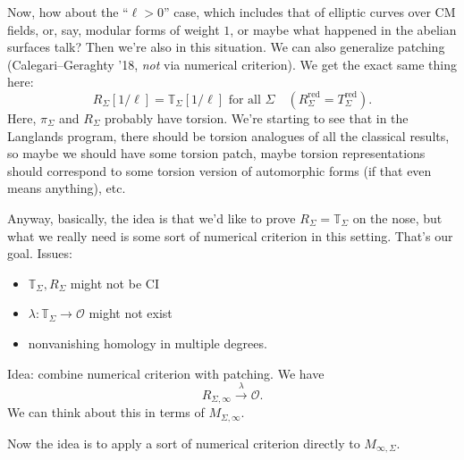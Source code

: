 \documentclass[reqno]{amsart} 
\begin{document}
Now, how about the ``$\ell > 0$'' case, which includes that of elliptic curves over CM fields, or, say, modular forms of weight $1$, or maybe what happened in the abelian surfaces talk?  Then we're also in this situation.  We can also generalize patching (Calegari--Geraghty '18, \emph{not} via numerical criterion).  We get the exact same thing here:
\begin{equation*}
  R_{\Sigma}[1 / \ell]
  = \mathbb{T}_{\Sigma}[1 / \ell] \text{ for all }
  \Sigma
  \quad
  (R_{\Sigma}^{\mathrm{red}} = T_{\Sigma}^{\mathrm{red}}).
\end{equation*}
Here, $\pi_{\Sigma}$ and $R_{\Sigma}$ probably have torsion.  We're starting to see that in the Langlands program, there should be torsion analogues of all the classical results, so maybe we should have some torsion patch, maybe torsion representations should correspond to some torsion version of automorphic forms (if that even means anything), etc.

Anyway, basically, the idea is that we'd like to prove $R_{\Sigma} = \mathbb{T}_{\Sigma}$ on the nose, but what we really need is some sort of numerical criterion in this setting.  That's our goal.  Issues:
\begin{itemize}
\item $\mathbb{T}_{\Sigma}, R_{\Sigma}$ might not be CI
\item $\lambda : \mathbb{T}_{\Sigma} \rightarrow \mathcal{O}$ might not exist
\item nonvanishing homology in multiple degrees.
\end{itemize}

Idea: combine numerical criterion with patching.  We have
\begin{equation*}
  R_{\Sigma, \infty} \xrightarrow{\lambda} \mathcal{O}.
\end{equation*}
We can think about this in terms of $M_{\Sigma, \infty}$.

Now the idea is to apply a sort of numerical criterion directly to $M_{\infty, \Sigma}$.
\end{document}
